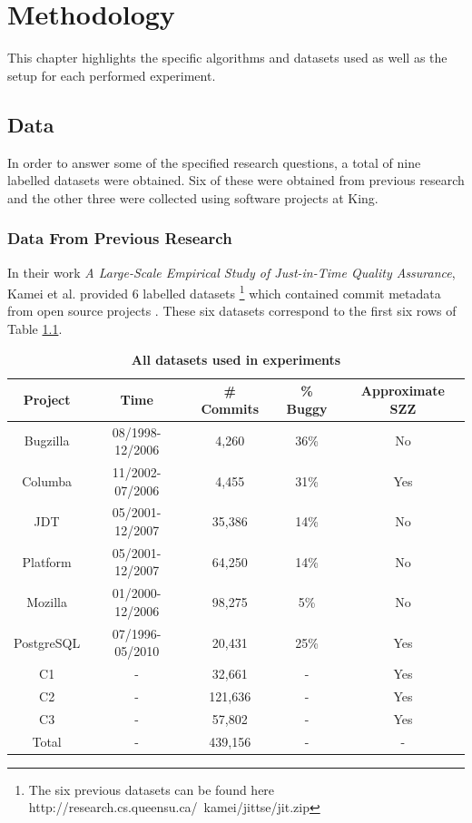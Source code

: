 \documentclass[../main.tex]{subfiles}
\begin{document}
\chapter{Methodology} \label{chapter:methodology}

This chapter highlights the specific algorithms and datasets used as well as the setup for each performed experiment.

\section{Data} 

In order to answer some of the specified research questions, a total of nine labelled datasets were obtained. Six of these were obtained from previous research \cite{kamei2013large} and the other three were collected using software projects at King.

\subsection{Data From Previous Research}

In their work \textit{A Large-Scale Empirical Study of Just-in-Time Quality Assurance}, Kamei et al. provided 6 labelled datasets \footnote{The six previous datasets can be found here http://research.cs.queensu.ca/~kamei/jittse/jit.zip} which contained commit metadata from open source projects \cite{kamei2013large}. These six datasets correspond to the first six rows of Table \ref{table:allData}. 
\vspace{10pt}

\begin{table}[h]
    \centering
    \caption{\textbf{All datasets used in experiments}}
    \begin{tabular}{|c c c c c|} 
    \hline
    \textbf{Project} & \textbf{Time} & \textbf{\# Commits} & \textbf{\% Buggy} & \textbf{Approximate SZZ}\\ 
    \hline\hline
     Bugzilla & 08/1998-12/2006 & 4,260 & 36\% & No\\ 
     \hline
    Columba & 11/2002-07/2006 & 4,455 & 31\% & Yes\\
    \hline
    JDT & 05/2001-12/2007 & 35,386 & 14\% & No\\
    \hline
    Platform & 05/2001-12/2007 & 64,250 & 14\% & No\\
    \hline
    Mozilla & 01/2000-12/2006 & 98,275 & 5\% & No\\
    \hline
    PostgreSQL & 07/1996-05/2010 & 20,431 & 25\% & Yes\\
    \hline
    C1 &  - & 32,661 & - & Yes\\ %
    \hline
    C2 &  - & 121,636 & - & Yes\\ %
    \hline
    C3 &  - & 57,802 & - &Yes\\ %
    \hline
    Total & - & 439,156 & - & - \\ %
    \hline
    \end{tabular}
    \label{table:allData}
\end{table}
\end{document}
